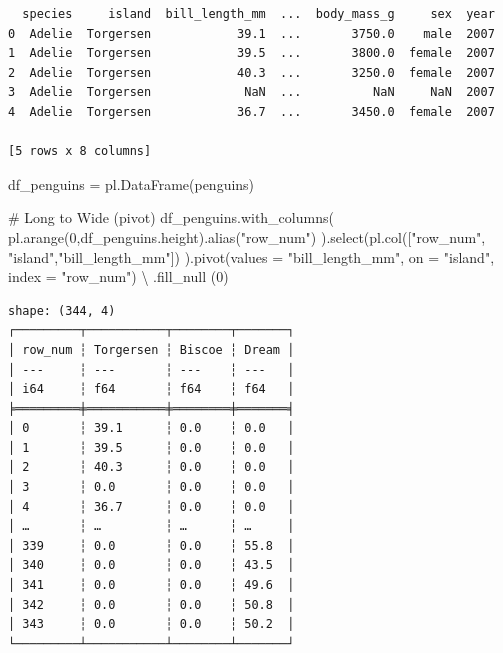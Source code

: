 \documentclass[
  letterpaper,
  DIV=11,
  numbers=noendperiod]{scrreprt}
\newenvironment{Shaded}{\begin{snugshade}}{\end{snugshade}}
\newcommand{\CommentTok}[1]{\textcolor[rgb]{0.37,0.37,0.37}{#1}}
\newcommand{\DecValTok}[1]{\textcolor[rgb]{0.68,0.00,0.00}{#1}}
\newcommand{\NormalTok}[1]{\textcolor[rgb]{0.00,0.23,0.31}{#1}}
\newcommand{\OperatorTok}[1]{\textcolor[rgb]{0.37,0.37,0.37}{#1}}
\newcommand{\StringTok}[1]{\textcolor[rgb]{0.13,0.47,0.30}{#1}}
\begin{document}
\begin{verbatim}
  species     island  bill_length_mm  ...  body_mass_g     sex  year
0  Adelie  Torgersen            39.1  ...       3750.0    male  2007
1  Adelie  Torgersen            39.5  ...       3800.0  female  2007
2  Adelie  Torgersen            40.3  ...       3250.0  female  2007
3  Adelie  Torgersen             NaN  ...          NaN     NaN  2007
4  Adelie  Torgersen            36.7  ...       3450.0  female  2007

[5 rows x 8 columns]
\end{verbatim}

\begin{Shaded}
\begin{Highlighting}[]
\NormalTok{df\_penguins }\OperatorTok{=}\NormalTok{ pl.DataFrame(penguins)}
\end{Highlighting}
\end{Shaded}

\begin{Shaded}
\begin{Highlighting}[]
\CommentTok{\# Long to Wide (pivot)}
\NormalTok{df\_penguins.with\_columns(}
\NormalTok{    pl.arange(}\DecValTok{0}\NormalTok{,df\_penguins.height).alias(}\StringTok{"row\_num"}\NormalTok{)}
\NormalTok{).select(pl.col([}\StringTok{"row\_num"}\NormalTok{, }\StringTok{"island"}\NormalTok{,}\StringTok{"bill\_length\_mm"}\NormalTok{])}
\NormalTok{).pivot(values }\OperatorTok{=} \StringTok{"bill\_length\_mm"}\NormalTok{, on }\OperatorTok{=} \StringTok{"island"}\NormalTok{, index }\OperatorTok{=} \StringTok{"row\_num"}\NormalTok{) }\OperatorTok{\textbackslash{}}
\NormalTok{    .fill\_null (}\DecValTok{0}\NormalTok{)}
\end{Highlighting}
\end{Shaded}

\begin{verbatim}
shape: (344, 4)
┌─────────┬───────────┬────────┬───────┐
│ row_num ┆ Torgersen ┆ Biscoe ┆ Dream │
│ ---     ┆ ---       ┆ ---    ┆ ---   │
│ i64     ┆ f64       ┆ f64    ┆ f64   │
╞═════════╪═══════════╪════════╪═══════╡
│ 0       ┆ 39.1      ┆ 0.0    ┆ 0.0   │
│ 1       ┆ 39.5      ┆ 0.0    ┆ 0.0   │
│ 2       ┆ 40.3      ┆ 0.0    ┆ 0.0   │
│ 3       ┆ 0.0       ┆ 0.0    ┆ 0.0   │
│ 4       ┆ 36.7      ┆ 0.0    ┆ 0.0   │
│ …       ┆ …         ┆ …      ┆ …     │
│ 339     ┆ 0.0       ┆ 0.0    ┆ 55.8  │
│ 340     ┆ 0.0       ┆ 0.0    ┆ 43.5  │
│ 341     ┆ 0.0       ┆ 0.0    ┆ 49.6  │
│ 342     ┆ 0.0       ┆ 0.0    ┆ 50.8  │
│ 343     ┆ 0.0       ┆ 0.0    ┆ 50.2  │
└─────────┴───────────┴────────┴───────┘
\end{verbatim}
\end{document}
